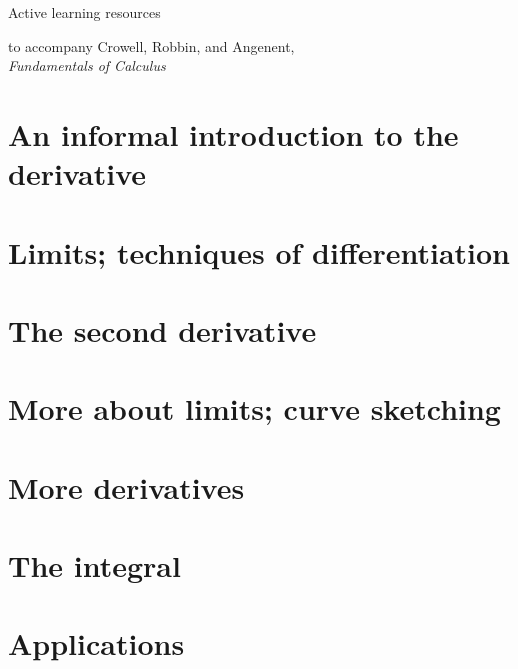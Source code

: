 \documentclass{beamer}
\begin{document}
\newcommand{\der}{\operatorname{d\!}{}}

\newcommand{\mygamma}{\textup{\textgamma}}



\begin{frame}{Active learning resources}

to accompany Crowell, Robbin, and Angenent,\\
 \emph{Fundamentals of Calculus}

\end{frame}

\tableofcontents

\section{An informal introduction to the derivative}




\section{Limits; techniques of differentiation}




\section{The second derivative}


\section{More about limits; curve sketching}



\section{More derivatives}


\section{The integral}


\section{Applications}

\end{document}
